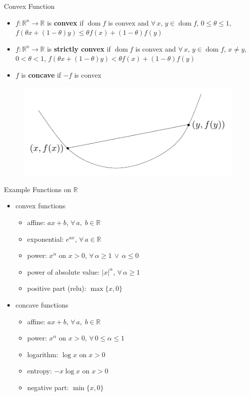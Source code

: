 \documentclass[10pt]{beamer}
\newcommand{\ds}{\displaystyle}
\DeclareMathOperator*{\dom}{dom}
\theoremstyle{definition}
\begin{document}
\begin{frame}{Convex Function}
  \begin{itemize}
    \item $f:\mathbb{R}^n\to\mathbb{R}$ is {\bf convex} if $\dom f$ is convex and $\forall\,x,\,y\in\dom f$, $0\leqslant\theta\leqslant 1$, $\ds f(\theta x + (1 - \theta)y)\leqslant\theta f(x) + (1 - \theta) f(y)$
    \item $f:\mathbb{R}^n\to\mathbb{R}$ is {\bf strictly convex} if $\dom f$ is convex and $\forall\,x,\,y\in\dom f$, $x\ne y$, $0 < \theta < 1$, $\ds f(\theta x + (1 - \theta)y) < \theta f(x) + (1 - \theta) f(y)$
    \item $f$ is {\bf concave} if $-f$ is convex
  \end{itemize}
  \begin{figure}[!htbp]
    \centering
    \includegraphics[scale=1,page=1]{fig/note06/03.pdf}
  \end{figure}
\end{frame}

\begin{frame}{Example Functions on $\mathbb{R}$}
  \begin{itemize}
    \item convex functions
      \begin{itemize}
        \item affine: $\ds ax + b$, $\forall\,a,\;b\in\mathbb{R}$
        \item exponential: $\ds e^{a x}$, $\forall\,a\in\mathbb{R}$
        \item power: $\ds x^\alpha$ on $x > 0$, $\forall\,\alpha\geqslant 1\,\vee\,\alpha\leqslant 0$
        \item power of absolute value: $\ds |x|^\alpha$, $\forall\,\alpha\geqslant 1$
        \item positive part (relu): $\max\{x, 0\}$
      \end{itemize}
    \item concave functions
      \begin{itemize}
        \item affine: $\ds ax + b$, $\forall\,a,\;b\in\mathbb{R}$
        \item power: $\ds x^\alpha$ on $x > 0$, $\forall\,0\leqslant\alpha\leqslant 1$
        \item logarithm: $\ds\log x$ on $x > 0$
        \item entropy: $\ds -x\log x$ on $x > 0$ 
        \item negative part: $\min\{x, 0\}$
      \end{itemize}
  \end{itemize}
\end{frame}
\end{document}
